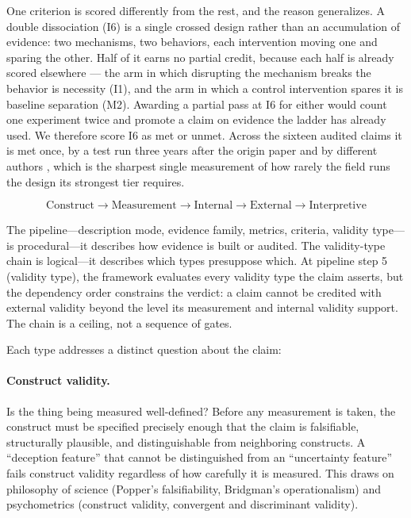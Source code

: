 \documentclass{article}
\begin{document}
One criterion is scored differently from the rest, and the reason generalizes. A double
dissociation (I6) is a single crossed design rather than an accumulation of evidence: two
mechanisms, two behaviors, each intervention moving one and sparing the other. Half of it
earns no partial credit, because each half is already scored elsewhere --- the arm in which
disrupting the mechanism breaks the behavior is necessity (I1), and the arm in which a
control intervention spares it is baseline separation (M2). Awarding a partial pass at I6
for either would count one experiment twice and promote a claim on evidence the ladder has
already used. We therefore score I6 as met or unmet. Across the sixteen audited claims it
is met once, by a test run three years after the origin paper and by different authors
\citep{feucht2025dual}, which is the sharpest single measurement of how rarely the field
runs the design its strongest tier requires.

\begin{equation}
\text{Construct} \rightarrow \text{Measurement} \rightarrow \text{Internal} \rightarrow \text{External} \rightarrow \text{Interpretive}
\label{eq:dependency}
\end{equation}

The pipeline---description mode, evidence family, metrics, criteria, validity type---is procedural---it describes how evidence is built or audited. The validity-type chain is logical---it describes which types presuppose which. At pipeline step 5 (validity type), the framework evaluates every validity type the claim asserts, but the dependency order constrains the verdict: a claim cannot be credited with external validity beyond the level its measurement and internal validity support. The chain is a ceiling, not a sequence of gates.

Each type addresses a distinct question about the claim:

\paragraph{Construct validity.} Is the thing being measured well-defined? Before any measurement is taken, the construct must be specified precisely enough that the claim is falsifiable, structurally plausible, and distinguishable from neighboring constructs. A ``deception feature'' that cannot be distinguished from an ``uncertainty feature'' fails construct validity regardless of how carefully it is measured. This draws on philosophy of science (Popper's falsifiability, Bridgman's operationalism) and psychometrics (construct validity, convergent and discriminant validity).
\end{document}
